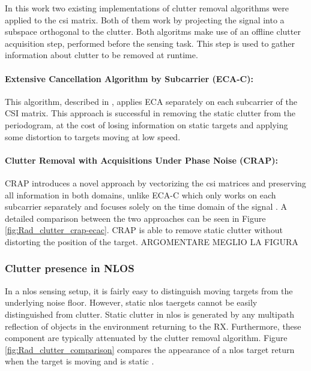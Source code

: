 	In this work two existing implementations of clutter removal algorithms were applied to the \gls{csi} matrix.
	Both of them work by projecting the signal into a subspace orthogonal to the clutter.
	Both algoritms make use of an offline clutter acquisition step, performed before the sensing task. This step is used to gather information about clutter to be removed at runtime.
	
	\paragraph{Extensive Cancellation Algorithm by Subcarrier (ECA-C):}
	This algorithm, described in \cite{Wan_Cheng_Gong_Zhao_Shao_2012}, applies ECA \cite{Colone_ECA_2009} separately on each subcarrier of the CSI matrix.
	This approach is successful in removing the static clutter from the periodogram, at the cost of losing information on static targets and applying some distortion to targets moving at low speed.
	\paragraph{Clutter Removal with Acquisitions Under Phase Noise (CRAP):}
	CRAP introduces a novel approach by vectorizing the \gls{csi} matrices and preserving all information in both domains, unlike ECA-C which only works on each subcarrier separately and focuses solely on the time domain of the signal \cite{Henninger_CRAP_2023}.
	A detailed comparison between the two approaches can be seen in Figure \ref{fig:Rad_clutter_crap-ecac}. CRAP is able to remove static clutter without distorting the position of the target. \alert{ARGOMENTARE MEGLIO LA FIGURA}
	
	
	\subsubsection{Clutter presence in NLOS}
	
	In a \gls{nlos} sensing setup, it is fairly easy to distinguish moving targets from the underlying noise floor.
	However, static \gls{nlos} taergets cannot be easily distinguished from clutter. Static clutter in \gls{nlos} is generated by any multipath reflection of objects in the environment returning to the RX. Furthermore, these component are typically attenuated by the clutter removal algorithm.
	Figure \ref{fig:Rad_clutter_comparison} compares the appearance of a \gls{nlos} target return when the target is moving  and is static .

